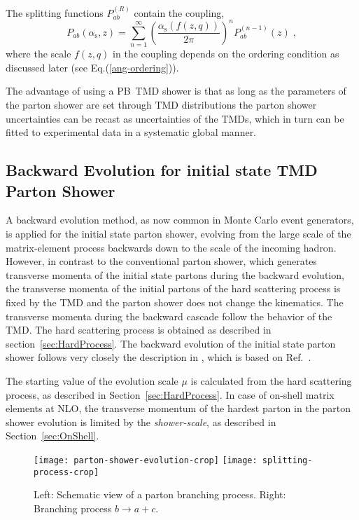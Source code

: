\documentclass[11pt]{article} \usepackage{mystyle-new}
\newcommand{\as}{\ensuremath{\alpha_\mathrm{s}}}
\def\PB{{PB}}
\begin{document}
The splitting functions $P_{ab}^{(R)} $ contain the coupling,  
\begin{equation}
P_{ab} (\as ,z) = \sum^{\infty}_{n=1} \left( \frac{\as(f(z,q)) }{2\pi}
\right)^{n} P_{ab}^{(n-1)}(z)\; ,
\label{Pab}
\end{equation}
where the scale $f( z,q)$ in the coupling depends on the ordering condition as discussed later (see Eq.(\ref{ang-ordering})).

The advantage of using a \PB\ TMD shower is that as long as the parameters of the parton shower are set through TMD distributions the parton shower uncertainties can be recast as uncertainties of the TMDs, which in turn can be fitted to experimental data in a systematic global manner.

\subsection{Backward Evolution for initial state TMD Parton Shower}
\label{sec:TMDshower}

A backward evolution method, as now common in Monte Carlo event generators, is applied for the initial state parton shower, evolving from the large scale of the matrix-element process backwards down to the scale of the incoming hadron. However, in contrast to the conventional parton shower, which generates transverse momenta of the initial state partons during the backward evolution, the transverse momenta of the initial partons of the hard scattering process is fixed by the TMD and the parton shower does not change the kinematics.
The transverse momenta during the backward cascade follow the behavior of the TMD.  The hard scattering process is obtained as described in section~\ref{sec:HardProcess}. 
The backward evolution of the initial state parton shower follows very closely the description in \cite{Jung:2010si,Jung:2001hx,Jung:2000hk}, which is based on Ref.~\cite{Bengtsson:1986gz}. 

The starting value of the evolution scale $\mu$ is calculated from the hard scattering process, as described in Section~\ref{sec:HardProcess}. In case of on-shell matrix elements at NLO, the transverse momentum of the hardest parton in the parton shower evolution is limited by the {\it shower-scale}, as described in Section~\ref{sec:OnShell}.

\begin{figure}[htb]
\begin{center} 
\texttt{[image: parton-shower-evolution-crop]} \hskip 2cm
\texttt{[image: splitting-process-crop]} 
  \caption{Left: Schematic view of a parton branching process. Right: Branching process $ b \to a + c$.}
\label{parton-branching}
\end{center}
\end{figure} 
\end{document}
